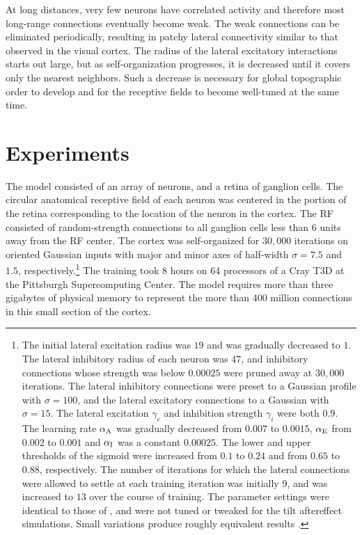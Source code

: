\documentclass[10pt]{article}   %
\begin{document}
At long distances, very few neurons have correlated activity and
therefore most long-range connections eventually become weak.  The
weak connections can be eliminated periodically, resulting in patchy
lateral connectivity similar to that observed in the visual cortex.
The radius of the lateral excitatory interactions starts out large,
but as self-organization progresses, it is decreased until it covers
only the nearest neighbors. Such a 
decrease is necessary for global topographic order to develop and for
the receptive fields to become well-tuned at the same time.



\section{Experiments}

The model consisted of an array of  neurons, and a
retina of  ganglion cells. The circular anatomical
receptive field of each neuron was centered in the portion of the
retina corresponding to the location of the neuron in the cortex.  The
RF consisted of random-strength connections to all ganglion cells less
than 6 units away from the RF center.  
The cortex was self-organized for $30,000$ iterations on oriented
Gaussian inputs with major and minor axes of half-width $\sigma=7.5$
and $1.5$, respectively.\footnote{ The initial lateral excitation radius
  was $19$ and was gradually decreased to $1$.  The lateral inhibitory
  radius of each neuron was $47$, and inhibitory connections whose
  strength was below $0.00025$ were pruned away at $30,000$
  iterations.  The lateral inhibitory connections were preset to a
  Gaussian profile with $\sigma=100$, and the lateral excitatory
  connections to a Gaussian with $\sigma=15$.  The lateral excitation
  $\gamma_e$ and inhibition strength $\gamma_i$ were both $0.9$. The
  learning rate $\alpha_{\rm A}$ was gradually decreased from $0.007$ to
  $0.0015$, $\alpha_{\rm E}$ from $0.002$ to $0.001$ and $\alpha_{\rm
    I}$ was a constant $0.00025$.  The lower and upper thresholds of
  the sigmoid were increased from $0.1$ to $0.24$ and from $0.65$ to
  $0.88$, respectively.  The number of iterations for which the
  lateral connections were allowed to settle at each training
  iteration was initially $9$, and was increased to $13$
  over the course of training.  The parameter settings were identical
  to those of , and were not tuned or tweaked for
  the tilt aftereffect simulations.  Small variations produce roughly
  equivalent results \cite{sirosh:phd}.   
} 
The training took 8 hours on 64 processors of a Cray T3D at the
Pittsburgh Supercomputing Center.  The model requires more than
three gigabytes of physical memory to represent the more than 400
million connections in this small section of the cortex.
\end{document}
